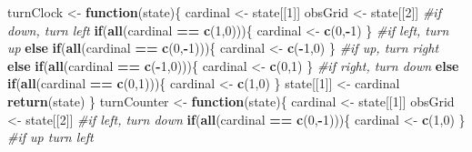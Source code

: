 \documentclass[]{article}
\newenvironment{Shaded}{\begin{snugshade}}{\end{snugshade}}
\newcommand{\CommentTok}[1]{\textcolor[rgb]{0.56,0.35,0.01}{\textit{#1}}}
\newcommand{\ControlFlowTok}[1]{\textcolor[rgb]{0.13,0.29,0.53}{\textbf{#1}}}
\newcommand{\DecValTok}[1]{\textcolor[rgb]{0.00,0.00,0.81}{#1}}
\newcommand{\KeywordTok}[1]{\textcolor[rgb]{0.13,0.29,0.53}{\textbf{#1}}}
\newcommand{\NormalTok}[1]{#1}
\newcommand{\OperatorTok}[1]{\textcolor[rgb]{0.81,0.36,0.00}{\textbf{#1}}}
\newcommand{\StringTok}[1]{\textcolor[rgb]{0.31,0.60,0.02}{#1}}
\begin{document}
\begin{Shaded}
\begin{Highlighting}[]
\NormalTok{turnClock <-}\StringTok{ }\ControlFlowTok{function}\NormalTok{(state)\{}
\NormalTok{  cardinal <-}\StringTok{ }\NormalTok{state[[}\DecValTok{1}\NormalTok{]]}
\NormalTok{  obsGrid <-}\StringTok{ }\NormalTok{state[[}\DecValTok{2}\NormalTok{]]}
  \CommentTok{#if down, turn left}
  \ControlFlowTok{if}\NormalTok{(}\KeywordTok{all}\NormalTok{(cardinal }\OperatorTok{==}\StringTok{ }\KeywordTok{c}\NormalTok{(}\DecValTok{1}\NormalTok{,}\DecValTok{0}\NormalTok{)))\{}
\NormalTok{    cardinal <-}\StringTok{ }\KeywordTok{c}\NormalTok{(}\DecValTok{0}\NormalTok{,}\OperatorTok{-}\DecValTok{1}\NormalTok{)}
\NormalTok{  \}}
  \CommentTok{#if left, turn up}
  \ControlFlowTok{else} \ControlFlowTok{if}\NormalTok{(}\KeywordTok{all}\NormalTok{(cardinal }\OperatorTok{==}\StringTok{ }\KeywordTok{c}\NormalTok{(}\DecValTok{0}\NormalTok{,}\OperatorTok{-}\DecValTok{1}\NormalTok{)))\{}
\NormalTok{    cardinal <-}\StringTok{ }\KeywordTok{c}\NormalTok{(}\OperatorTok{-}\DecValTok{1}\NormalTok{,}\DecValTok{0}\NormalTok{)}
\NormalTok{  \}}
  \CommentTok{#if up, turn right}
  \ControlFlowTok{else} \ControlFlowTok{if}\NormalTok{(}\KeywordTok{all}\NormalTok{(cardinal }\OperatorTok{==}\StringTok{ }\KeywordTok{c}\NormalTok{(}\OperatorTok{-}\DecValTok{1}\NormalTok{,}\DecValTok{0}\NormalTok{)))\{}
\NormalTok{    cardinal <-}\StringTok{ }\KeywordTok{c}\NormalTok{(}\DecValTok{0}\NormalTok{,}\DecValTok{1}\NormalTok{)}
\NormalTok{  \}}
   \CommentTok{#if right, turn down}
  \ControlFlowTok{else} \ControlFlowTok{if}\NormalTok{(}\KeywordTok{all}\NormalTok{(cardinal }\OperatorTok{==}\StringTok{ }\KeywordTok{c}\NormalTok{(}\DecValTok{0}\NormalTok{,}\DecValTok{1}\NormalTok{)))\{}
\NormalTok{    cardinal <-}\StringTok{ }\KeywordTok{c}\NormalTok{(}\DecValTok{1}\NormalTok{,}\DecValTok{0}\NormalTok{)}
\NormalTok{  \}}
\NormalTok{  state[[}\DecValTok{1}\NormalTok{]] <-}\StringTok{ }\NormalTok{cardinal}
  \KeywordTok{return}\NormalTok{(state)}
\NormalTok{\}}
\NormalTok{turnCounter <-}\StringTok{ }\ControlFlowTok{function}\NormalTok{(state)\{}
\NormalTok{  cardinal <-}\StringTok{ }\NormalTok{state[[}\DecValTok{1}\NormalTok{]]}
\NormalTok{  obsGrid <-}\StringTok{ }\NormalTok{state[[}\DecValTok{2}\NormalTok{]]}
  \CommentTok{#if left, turn down}
  \ControlFlowTok{if}\NormalTok{(}\KeywordTok{all}\NormalTok{(cardinal }\OperatorTok{==}\StringTok{ }\KeywordTok{c}\NormalTok{(}\DecValTok{0}\NormalTok{,}\OperatorTok{-}\DecValTok{1}\NormalTok{)))\{}
\NormalTok{    cardinal <-}\StringTok{ }\KeywordTok{c}\NormalTok{(}\DecValTok{1}\NormalTok{,}\DecValTok{0}\NormalTok{)}
\NormalTok{  \}}
  \CommentTok{#if up turn left}

\end{Highlighting}
\end{Shaded}
\end{document}
